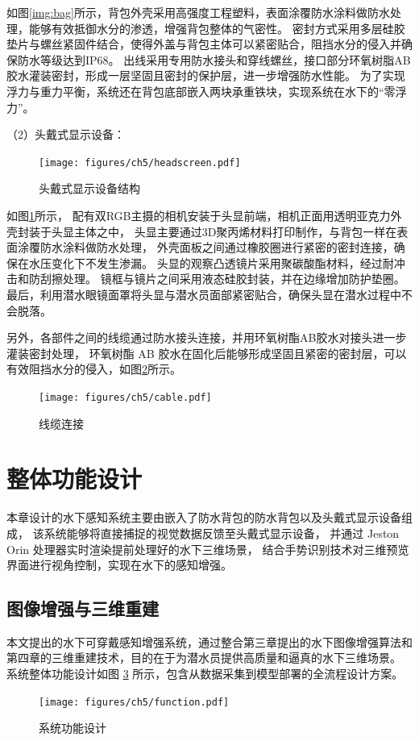 如图\ref{img:bag}所示，背包外壳采用高强度工程塑料，表面涂覆防水涂料做防水处理，能够有效抵御水分的渗透，增强背包整体的气密性。
密封方式采用多层硅胶垫片与螺丝紧固件结合，使得外盖与背包主体可以紧密贴合，阻挡水分的侵入并确保防水等级达到IP68。
出线采用专用防水接头和穿线螺丝，接口部分环氧树脂AB胶水灌装密封，形成一层坚固且密封的保护层，进一步增强防水性能。
为了实现浮力与重力平衡，系统还在背包底部嵌入两块承重铁块，实现系统在水下的“零浮力”。

（2）头戴式显示设备：
\begin{figure}[h]
    \vspace{1mm}
    \centering
    \texttt{[image: figures/ch5/headscreen.pdf]}
    \caption{头戴式显示设备结构}
    \label{img:camera}
\end{figure}

如图\ref{img:camera}所示，
配有双RGB主摄的相机安装于头显前端，相机正面用透明亚克力外壳封装于头显主体之中，
头显主要通过3D聚丙烯材料打印制作，与背包一样在表面涂覆防水涂料做防水处理，
外壳面板之间通过橡胶圈进行紧密的密封连接，确保在水压变化下不发生渗漏。
头显的观察凸透镜片采用聚碳酸酯材料，经过耐冲击和防刮擦处理。
镜框与镜片之间采用液态硅胶封装，并在边缘增加防护垫圈。
最后，利用潜水眼镜面罩将头显与潜水员面部紧密贴合，确保头显在潜水过程中不会脱落。

另外，各部件之间的线缆通过防水接头连接，并用环氧树酯AB胶水对接头进一步灌装密封处理，
环氧树酯 AB 胶水在固化后能够形成坚固且紧密的密封层，可以有效阻挡水分的侵入，如图\ref{img:cable}所示。
\begin{figure}
    \vspace{6mm}
    \centering
    \texttt{[image: figures/ch5/cable.pdf]} \hspace{-3.5cm}
    \caption{线缆连接}
    \label{img:cable}
\end{figure}

\section{整体功能设计}
本章设计的水下感知系统主要由嵌入了防水背包的防水背包以及头戴式显示设备组成，
该系统能够将直接捕捉的视觉数据反馈至头戴式显示设备，
并通过 Jeston Orin 处理器实时渲染提前处理好的水下三维场景，
结合手势识别技术对三维预览界面进行视角控制，实现在水下的感知增强。

\subsection{图像增强与三维重建}
本文提出的水下可穿戴感知增强系统，通过整合第三章提出的水下图像增强算法和第四章的三维重建技术，目的在于为潜水员提供高质量和逼真的水下三维场景。
系统整体功能设计如图 \ref{img:function} 所示，包含从数据采集到模型部署的全流程设计方案。
\begin{figure}[ht]
    \centering
    \vspace{0.5cm}
    \texttt{[image: figures/ch5/function.pdf]}
    \caption{系统功能设计}
    \label{img:function}
\end{figure}

